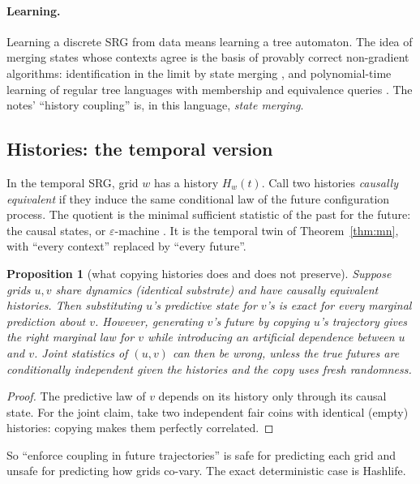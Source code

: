 \documentclass[11pt]{article}
\newtheorem{proposition}[theorem]{Proposition}
\theoremstyle{definition}
\begin{document}
\paragraph{Learning.}
Learning a discrete SRG from data means learning a tree automaton. The idea of merging states
whose contexts agree is the basis of provably correct non-gradient algorithms: identification in
the limit by state merging \cite{garcia1993}, and polynomial-time learning of regular tree
languages with membership and equivalence queries \cite{sakakibara1990,drewes2003}. The notes'
``history coupling'' is, in this language, \emph{state merging}.

\subsection{Histories: the temporal version}\label{sec:time}
In the temporal SRG, grid $w$ has a history $H_w(t)$. Call two histories \emph{causally
equivalent} if they induce the same conditional law of the future configuration process. The
quotient is the minimal sufficient statistic of the past for the future: the causal states, or
$\varepsilon$-machine \cite{crutchfield1989,shalizi2001}. It is the temporal twin of
Theorem~\ref{thm:mn}, with ``every context'' replaced by ``every future''.

\begin{proposition}[what copying histories does and does not preserve]\label{prop:hist}
Suppose grids $u,v$ share dynamics (identical substrate) and have causally equivalent histories.
Then substituting $u$'s predictive state for $v$'s is \emph{exact for every marginal prediction
about $v$}. However, generating $v$'s future \emph{by copying $u$'s trajectory} gives the right
marginal law for $v$ while introducing an artificial dependence between $u$ and $v$. Joint
statistics of $(u,v)$ can then be wrong, unless the true futures are conditionally independent
given the histories and the copy uses fresh randomness.
\end{proposition}
\begin{proof}The predictive law of $v$ depends on its history only through its causal state.
For the joint claim, take two independent fair coins with identical (empty) histories: copying
makes them perfectly correlated.\end{proof}
\noindent So ``enforce coupling in future trajectories'' is safe for predicting each grid and
unsafe for predicting how grids co-vary. The exact deterministic case is Hashlife.
\end{document}
